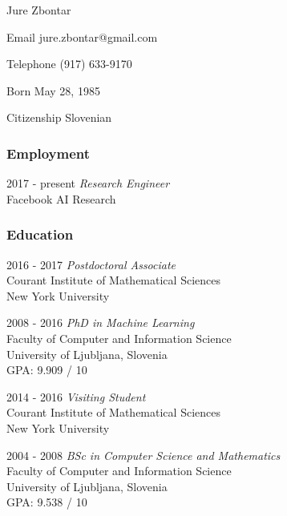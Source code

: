 \documentclass[12pt,a4paper]{article}
\begin{document}
\begin{cv}{Jure Zbontar}

\begin{cvlist}{}
\item[Email] jure.zbontar@gmail.com
\item[Telephone] (917) 633-9170
\item[Born] May 28, 1985
\item[Citizenship] Slovenian

\end{cvlist}

\subsubsection*{Employment}
\begin{cvlist}{}
\item[2017 - present] \emph{Research Engineer} \\
Facebook AI Research
\end{cvlist}

\subsubsection*{Education}
\begin{cvlist}{}

\item[2016 - 2017] \emph{Postdoctoral Associate} \\
Courant Institute of Mathematical Sciences \\
New York University

\item[2008 - 2016] \emph{PhD in Machine Learning} \\
Faculty of Computer and Information Science \\
University of Ljubljana, Slovenia \\
GPA: 9.909 / 10

\item[2014 - 2016] \emph{Visiting Student} \\
Courant Institute of Mathematical Sciences \\
New York University

\item[2004 - 2008] \emph{BSc in Computer Science and Mathematics} \\
Faculty of Computer and Information Science \\
University of Ljubljana, Slovenia \\
GPA: 9.538 / 10


\end{cvlist}
\end{cv}
\end{document}
